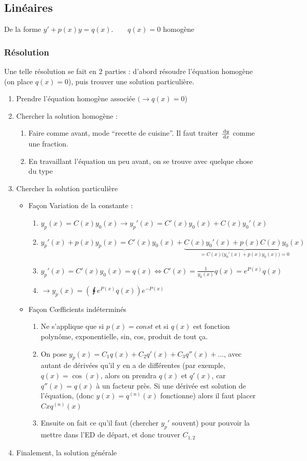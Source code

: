 \documentclass[12pt,a4paper]{article}
\renewcommand{\)}{\right)}
\renewcommand{\(}{\left(}
\begin{document}
\subsection{Linéaires}
De la forme $y' + p(x)y = q(x).\qquad q(x) = 0$ homogène
\subsubsection{Résolution}
Une telle résolution se fait en 2 parties : d'abord résoudre l'équation homogène (on place $q(x) = 0$), puis trouver une solution particulière.
\begin{enumerate}
	\item Prendre l'équation homogène associée $(\to q(x) = 0$)
	\item Chercher la solution homogène :
		\begin{enumerate}
			\item Faire comme avant, mode \enquote{recette de cuisine}. Il faut traiter $\frac{\, \mathrm d y}{\, \mathrm d x}$ comme une fraction.
			\item En travaillant l'équation un peu avant, on se trouve avec quelque chose du type 
		\end{enumerate}
	\item Chercher la solution particulière 
		\begin{itemize}
			\item Façon Variation de la constante :
				\begin{enumerate}
					\item $y_p(x) = C(x)y_0(x) \to y_p'(x) = C'(x)y_0(x) + C(x)y_0'(x)$
					\item $y_p'(x) + p(x)y_p(x) = C'(x)y_0(x) + \underbrace{C(x)y_0'(x) + p(x)C(x)y_0(x)}_{= C(x)\big(y_0'(x) + p(x)y_0(x)\big) = 0}$
					\item $y_p'(x) = C'(x)y_0(x) = q(x) \iff C'(x) = \frac{1}{y_0(x)}q(x) = e^{P(x)}q(x)$
					\item $\to y_p(x) = \left(\intx{}{}{e^{P(x)}q(x)}\right)e^{-P(x)}$
				\end{enumerate}
			\item Façon C\oe fficients indéterminés
				\begin{enumerate}
					\item Ne s'applique que si $p(x) = const$ et si $q(x)$ est fonction polynôme, exponentielle, sin, cos, produit de tout ça.
					\item On pose $y_p(x) = C_1q(x) + C_2q'(x) + C_3q''(x) + ...$, avec autant de dérivées qu'il y en a de différentes (par exemple, $q(x) = \cos(x)$, alors on prendra $q(x)$ et $q'(x)$, car $q''(x) = q(x)$ à un facteur près. Si une dérivée est solution de l'équation, (donc $y(x) = q^{(n)}(x)$ fonctionne) alors il faut placer $Cxq^{(n)}(x)$
					\item Ensuite on fait ce qu'il faut (chercher $y_p'$ souvent) pour pouvoir la mettre dans l'ED de départ, et donc trouver $C_{1,2}$
				\end{enumerate}
		\end{itemize}
	\item Finalement, la solution générale 
\end{enumerate}
\end{document}
